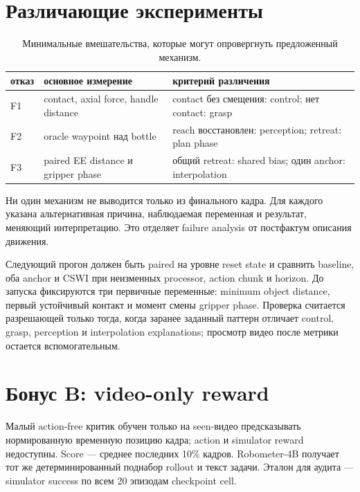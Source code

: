 \documentclass[10pt,twocolumn]{article}
\newcommand{\tightcaption}[1]{\caption{#1}\vspace{-3pt}}
\begin{document}
\section{Различающие эксперименты}

\begin{table}[h]
\centering\scriptsize
\begin{tabularx}{\linewidth}{@{}lXX@{}}\toprule
отказ & основное измерение & критерий различения\\\midrule
F1 & contact, axial force, handle distance & contact без смещения: control; нет contact: grasp\\
F2 & oracle waypoint над bottle & reach восстановлен: perception; retreat: plan phase\\
F3 & paired EE distance и gripper phase & общий retreat: shared bias; один anchor: interpolation\\
\bottomrule
\end{tabularx}
\tightcaption{Минимальные вмешательства, которые могут опровергнуть предложенный механизм.}
\end{table}

Ни один механизм не выводится только из финального кадра. Для каждого указана альтернативная причина,
наблюдаемая переменная и результат, меняющий интерпретацию. Это отделяет failure analysis от
постфактум описания движения.

Следующий прогон должен быть paired на уровне reset state и сравнить baseline, оба anchor и CSWI при
неизменных processor, action chunk и horizon. До запуска фиксируются три первичные переменные:
minimum object distance, первый устойчивый контакт и момент смены gripper phase. Проверка считается
разрешающей только тогда, когда заранее заданный паттерн отличает control, grasp, perception и
interpolation explanations; просмотр видео после метрики остается вспомогательным.

\clearpage

\section{Бонус B: video-only reward}

Малый action-free критик обучен только на seen-видео предсказывать нормированную временную позицию
кадра; action и simulator reward недоступны. Score --- среднее последних 10\% кадров. Robometer-4B
\cite{robometer} получает тот же детерминированный поднабор rollout и текст задачи. Эталон для аудита
--- simulator success по всем 20 эпизодам checkpoint cell.
\end{document}
